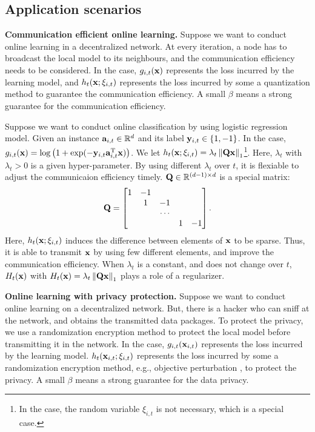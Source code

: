 \documentclass{article}
\begin{document}
\subsection{Application scenarios}
\label{subsection_application_scenarions}
{\color{blue}


\textbf{Communication efficient online learning.} Suppose we want to conduct online learning in a decentralized network. At every iteration, a node has to broadcast the local model to its neighbours, and the communication efficiency needs to be considered. In the case, $g_{i,t}({\bf x})$ represents the loss incurred by the learning model, and $h_t({\bf x};\xi_{i,t})$ represents the loss incurred by some a quantization method to guarantee the communication efficiency. A small $\beta$ means a strong guarantee for the communication efficiency.


Suppose we want to conduct online classification by using logistic regression model. Given an instance ${\bf a}_{i,t} \in \mathbb{R}^d$ and its label ${\bf y}_{i,t} \in \{1,-1\}$. In the case, $g_{i,t}({\bf x}) = \log\left( 1 + \exp(-{\bf y}_{i,t}{\bf a}_{i,t}^{\rm T} {\bf x}) \right)$. We let $h_t({\bf x};\xi_{i,t}) = \lambda_t \left\lVert{\bf Q}{\bf x}\right\rVert_1$\footnote{In the case,  the  random variable $\xi_{i,t}$ is not necessary, which is a special case. }.  Here, $\lambda_t$ with $\lambda_t>0$ is a given hyper-parameter. By using different $\lambda_t$ over $t$, it is flexiable to adjust the communicaion efficiency timely. ${\bf Q}\in\mathbb{R}^{(d-1)\times d}$ is a special matrix:
\begin{align}
\nonumber
{\bf Q} = \begin{bmatrix}
 1&  -1 & & &\\ 
 & 1 & -1 & &\\ 
 &  & \cdots & &\\ 
 &  &  &  1& -1
\end{bmatrix}.
\end{align} Here, $h_t({\bf x};\xi_{i,t})$ induces the difference between elements of ${\bf x}$ to be sparse. Thus, it is able to transmit ${\bf x}$ by using few different elements, and improve the communication efficiency.  When $\lambda_t$ is a constant, and does not change over $t$, $H_t({\bf x})$ with $H_t({\bf x}) = \lambda_t \left\lVert{\bf Q}{\bf x}\right\rVert_1$ plays a role of a regularizer.




 
\textbf{Online learning with privacy protection.} Suppose we want to conduct online learning on a decentralized network. But, there is a hacker who can sniff at the network, and obtains the transmitted data packages. To protect the privacy, we use a randomization encryption method to protect the local model before transmitting it in the network. In the case, $g_{i,t}({\bf x}_{i,t})$ represents the loss incurred by the learning model. $h_{t}({\bf x}_{i,t};\xi_{i,t})$ represents the loss incurred by some a randomization encryption method, e.g., objective perturbation \citep{Chaudhuri:2011tr,NIPS2017_6865}, to protect the privacy. A small $\beta$ means a strong guarantee for the data privacy.  


}
\end{document}

